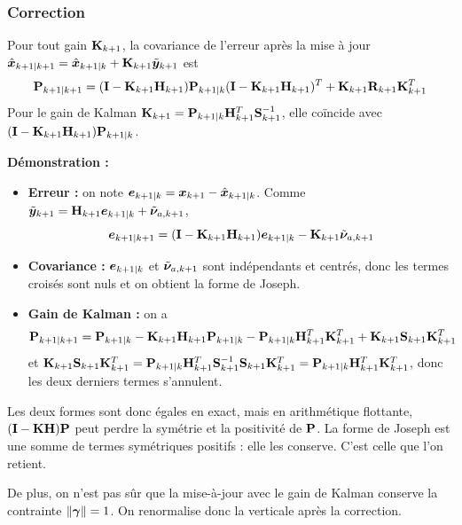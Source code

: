 \subsubsection{Correction}
\begin{proposition}
    Pour tout gain $\mathbf{K}_{k+1}$, la covariance de l'erreur après la mise à jour
    $\hat{\bm{x}}_{k+1|k+1} = \hat{\bm{x}}_{k+1|k} + \mathbf{K}_{k+1}\tilde{\bm{y}}_{k+1}$ est
    \[
        \mathbf{P}_{k+1|k+1} = (\mathbf{I} - \mathbf{K}_{k+1}\mathbf{H}_{k+1})\mathbf{P}_{k+1|k}(\mathbf{I} - \mathbf{K}_{k+1}\mathbf{H}_{k+1})^T + \mathbf{K}_{k+1}\mathbf{R}_{k+1}\mathbf{K}_{k+1}^T
    \]
    Pour le gain de Kalman $\mathbf{K}_{k+1} = \mathbf{P}_{k+1|k}\mathbf{H}_{k+1}^T\mathbf{S}_{k+1}^{-1}$, elle coïncide avec $(\mathbf{I} - \mathbf{K}_{k+1}\mathbf{H}_{k+1})\mathbf{P}_{k+1|k}$.
\end{proposition}
\textbf{Démonstration : }
\begin{itemize}
    \item \textbf{Erreur : } on note $\bm{e}_{k+1|k} = \bm{x}_{k+1} - \hat{\bm{x}}_{k+1|k}$. Comme $\tilde{\bm{y}}_{k+1} = \mathbf{H}_{k+1}\bm{e}_{k+1|k} + \tilde{\bm{\nu}}_{a,k+1}$,
    \[
        \bm{e}_{k+1|k+1} = (\mathbf{I} - \mathbf{K}_{k+1}\mathbf{H}_{k+1})\bm{e}_{k+1|k} - \mathbf{K}_{k+1}\tilde{\bm{\nu}}_{a,k+1}
    \]
    \item \textbf{Covariance : } $\bm{e}_{k+1|k}$ et $\tilde{\bm{\nu}}_{a,k+1}$ sont indépendants et centrés, donc les termes croisés sont nuls et on obtient la forme de Joseph.
    \item \textbf{Gain de Kalman : } on a
    \[
        \mathbf{P}_{k+1|k+1} = \mathbf{P}_{k+1|k} - \mathbf{K}_{k+1}\mathbf{H}_{k+1}\mathbf{P}_{k+1|k} - \mathbf{P}_{k+1|k}\mathbf{H}_{k+1}^T\mathbf{K}_{k+1}^T + \mathbf{K}_{k+1}\mathbf{S}_{k+1}\mathbf{K}_{k+1}^T
    \]
    et $\mathbf{K}_{k+1}\mathbf{S}_{k+1}\mathbf{K}_{k+1}^T = \mathbf{P}_{k+1|k}\mathbf{H}_{k+1}^T\mathbf{S}_{k+1}^{-1}\mathbf{S}_{k+1}\mathbf{K}_{k+1}^T =\mathbf{P}_{k+1|k}\mathbf{H}_{k+1}^T\mathbf{K}_{k+1}^T$, donc les deux derniers termes s'annulent.
\end{itemize}
Les deux formes sont donc égales en exact, mais en arithmétique flottante, $(\mathbf{I} - \mathbf{K}\mathbf{H})\mathbf{P}$ peut perdre la symétrie et la positivité de $\mathbf{P}$. La forme de Joseph est une somme de termes symétriques positifs : elle les conserve. C'est celle que l'on retient.

De plus, on n'est pas sûr que la mise-à-jour avec le gain de Kalman conserve la contrainte $\|\bm{\gamma}\| = 1$. On renormalise donc la verticale après la correction.

